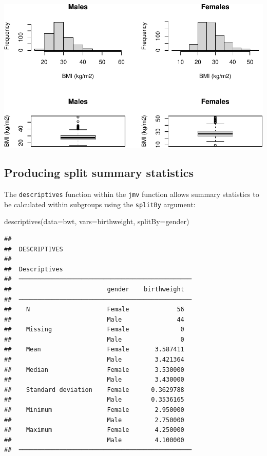\documentclass[
]{memoir}
\newenvironment{Shaded}{\begin{snugshade}}{\end{snugshade}}
\newcommand{\AttributeTok}[1]{\textcolor[rgb]{0.77,0.63,0.00}{#1}}
\newcommand{\FunctionTok}[1]{\textcolor[rgb]{0.00,0.00,0.00}{#1}}
\newcommand{\NormalTok}[1]{#1}
\begin{document}
\includegraphics{phcm9795-R-notes_files/figure-latex/unnamed-chunk-70-1.pdf}

\hypertarget{producing-split-summary-statistics}{%
\subsection{Producing split summary statistics}\label{producing-split-summary-statistics}}

The \texttt{descriptives} function within the \texttt{jmv} function allows summary statistics to be calculated within subgroups using the \texttt{splitBy} argument:

\begin{Shaded}
\begin{Highlighting}[]
\FunctionTok{descriptives}\NormalTok{(}\AttributeTok{data=}\NormalTok{bwt, }\AttributeTok{vars=}\NormalTok{birthweight, }\AttributeTok{splitBy=}\NormalTok{gender)}
\end{Highlighting}
\end{Shaded}

\begin{verbatim}
## 
##  DESCRIPTIVES
## 
##  Descriptives                                    
##  ─────────────────────────────────────────────── 
##                          gender    birthweight   
##  ─────────────────────────────────────────────── 
##    N                     Female             56   
##                          Male               44   
##    Missing               Female              0   
##                          Male                0   
##    Mean                  Female       3.587411   
##                          Male         3.421364   
##    Median                Female       3.530000   
##                          Male         3.430000   
##    Standard deviation    Female      0.3629788   
##                          Male        0.3536165   
##    Minimum               Female       2.950000   
##                          Male         2.750000   
##    Maximum               Female       4.250000   
##                          Male         4.100000   
##  ───────────────────────────────────────────────
\end{verbatim}
\end{document}
